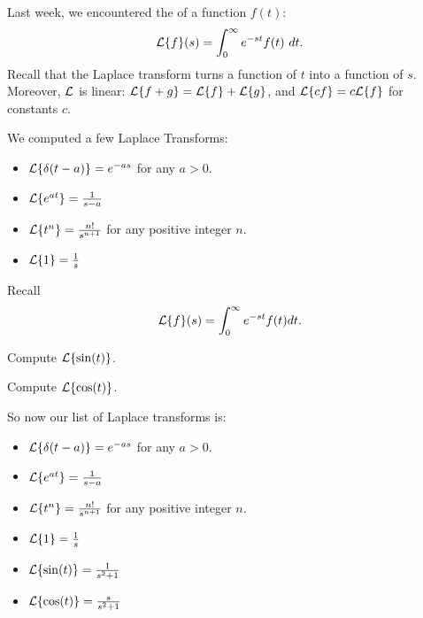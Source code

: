 \begin{applicationActivities}

\begin{observation}
Last week, we encountered the  of a function \(f(t)\):
\[\L\{f\}(s)=\int _0 ^\infty e^{-st}f(t)\ dt.\]
\vfill
Recall that the Laplace transform turns a function of \(t\) into a function of \(s\).
\vfill
Moreover, \(\mathcal{L}\) is linear: \(\mathcal{L}\{f+g\}=\mathcal{L}\{f\}+\mathcal{L}\{g\}\), and \(\mathcal{L}\{cf\}=c\mathcal{L}\{f\}\) for constants \(c\).
\end{observation}

\begin{observation}
We computed a few Laplace Transforms:
\begin{itemize}
\item \(\mathcal{L}\{\delta(t-a)\} = e^{-as}\) for any \(a>0\).
\item \(\mathcal{L}\{e^{at}\} = \frac{1}{s-a}\) 
\item \(\mathcal{L}\{t^n\} = \frac{n!}{s^{n+1}}\) for any positive integer \(n\).
\item \(\mathcal{L}\{1\} = \frac{1}{s}\)
\end{itemize}
\end{observation}

\begin{activity}{10}
Recall \[\mathcal{L}\{f\}(s)=\int _0 ^\infty e^{-st}f(t)dt.\]
\begin{subactivity}
Compute \(\mathcal{L}\{\sin(t)\}\).
\end{subactivity}
\begin{subactivity}
Compute \(\mathcal{L}\{\cos(t)\}\).
\end{subactivity}
\end{activity}

\begin{observation}
So now our list of Laplace transforms is:
\begin{itemize}
\item \(\mathcal{L}\{\delta(t-a)\} = e^{-as}\) for any \(a>0\).
\item \(\mathcal{L}\{e^{at}\} = \frac{1}{s-a}\) 
\item \(\mathcal{L}\{t^n\} = \frac{n!}{s^{n+1}}\) for any positive integer \(n\).
\item \(\mathcal{L}\{1\} = \frac{1}{s}\)
\item \(\mathcal{L}\{\sin(t)\} = \frac{1}{s^2+1}\)
\item \(\mathcal{L}\{\cos(t)\} = \frac{s}{s^2+1}\)
\end{itemize}
\end{observation}


\end{applicationActivities}
